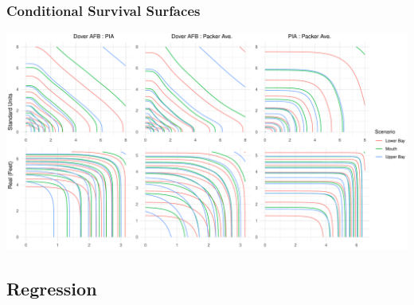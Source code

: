 \documentclass[aspectratio=169,10pt]{beamer}
\newlength{\frametextheight}
\begin{document}
\begin{frame}
    \frametitle{Conditional Survival Surfaces}
    \begin{center}
        \includegraphics[height=0.99\frametextheight]{./ch3/plots/condsurv/condsurv_2d_mcmc_combined}
    \end{center}
\end{frame} %

\subsection{Regression}
\end{document}
